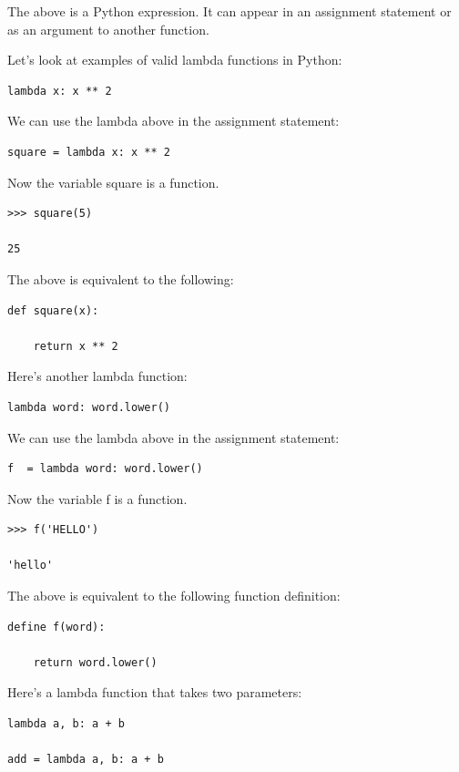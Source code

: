 \documentclass{article}
\begin{document}
The above is a Python expression.  It can appear in an assignment statement or as an argument to another function.

Let's look at examples of valid lambda functions in Python:

\begin{lstlisting}
lambda x: x ** 2
\end{lstlisting}

We can use the lambda above in the assignment statement:

\begin{lstlisting}
square = lambda x: x ** 2
\end{lstlisting}

Now the variable square is a function.  
\\
\begin{lstlisting}
>>> square(5)

25
\end{lstlisting}

The above is equivalent to the following:

\begin{lstlisting}
def square(x):

    return x ** 2
\end{lstlisting}

Here's another lambda function:

\begin{lstlisting}
lambda word: word.lower()
\end{lstlisting}

We can use the lambda above in the assignment statement:

\begin{lstlisting}
f  = lambda word: word.lower()
\end{lstlisting}

Now the variable f is a function.

\begin{lstlisting}
>>> f('HELLO')

'hello'
\end{lstlisting}

The above is equivalent to the following function definition:

\begin{lstlisting}
define f(word):

    return word.lower()
\end{lstlisting}

Here's a lambda function that takes two parameters:

\begin{lstlisting}
lambda a, b: a + b

add = lambda a, b: a + b
\end{lstlisting}
\end{document}
